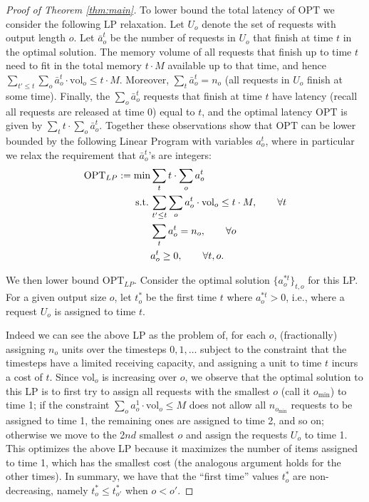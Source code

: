 \documentclass[11pt, a4paper]{article}
\theoremstyle{plain}
\theoremstyle{definition}
\theoremstyle{remark}
\newcommand{\OPT}{\text{OPT}}
\newcommand{\vol}{\textrm{vol}}
\begin{document}
\begin{proof}[Proof of Theorem \ref{thm:main}]
To lower bound the total latency of $\OPT$ we consider the following LP relaxation. Let $U_o$ denote the set of requests with output length $o$. Let $\bar{a}^t_o$ be the number of requests in $U_o$ that finish at time $t$ in the optimal solution. The memory volume of all requests that finish up to time $t$ need to fit in the total memory $t \cdot M$ available up to that time, and hence $\sum_{t' \le t} \sum_o \bar{a}^t_o \cdot \vol_o \le t \cdot M$. Moreover, $\sum_t \bar{a}^t_o = n_o$ (all requests in $U_o$ finish at some time). Finally, the $\sum_o \bar{a}^t_o$ requests that finish at time $t$ have latency (recall all requests are released at time 0) equal to $t$, and the optimal latency $\OPT$ is given by $\sum_t t \cdot \sum_o \bar{a}^t_o$. Together these observations show that $\OPT$ can be lower bounded by the following Linear Program with variables $a^t_o$, where in particular we relax the requirement that $\bar{a}^t_o$'s are integers:
%
\begin{align}
	\OPT_{LP} := \min &\sum_t t \cdot \sum_o a_o^t \notag\\
	\textrm{s.t.}\,& \sum_{t' \le t} \sum_o a^t_o \cdot \vol_o \le t \cdot M, \qquad \forall t \label{eq:LPmem}\\
	&\sum_t a^t_o = n_o, \qquad \forall o \notag\\
	&a^t_o \ge 0, \qquad \forall t,o. \notag
\end{align}


We then lower bound $\OPT_{LP}$. Consider the optimal solution $\{a^{* t}_o\}_{t,o}$ for this LP. For a given output size $o$, let $t^*_o$ be the first time $t$ where $a^{* t}_o > 0$, i.e., where a request $U_o$ is assigned to time $t$. 

Indeed we can see the above LP as the problem of, for each $o$, (fractionally) assigning $n_o$ units over the timesteps $0,1,\ldots$ subject to the constraint that the timesteps have a limited receiving capacity, and assigning a unit to time $t$ incurs a cost of $t$. Since $\vol_o$ is increasing over $o$, we observe that the optimal solution to this LP is to first try to assign all requests with the smallest $o$ (call it $o_{\min}$) to time 1; if the constraint $\sum_o a^1_o \cdot \vol_o \le M$ does not allow all $n_{o_{\min}}$ requests to be assigned to time 1, the remaining ones are assigned to time 2, and so on; otherwise we move to the 2$nd$ smallest $o$ and assign the requests $U_o$ to time 1. This optimizes the above LP because it maximizes the number of items assigned to time 1, which has the smallest cost (the analogous argument holds for the other times). In summary, we have that the ``first time'' values $t^*_o$ are non-decreasing, namely $t^*_o \le t^*_{o'}$ when $o < o'$. 


\end{proof}
\end{document}
